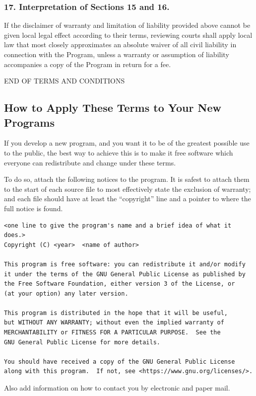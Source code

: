 \subsubsection{17. Interpretation of Sections 15 and 16.}
If the disclaimer of warranty and limitation of liability provided above cannot be given local legal effect according to their terms, reviewing courts shall apply local law that most closely approximates an absolute waiver of all civil liability in connection with the Program, unless a warranty or assumption of liability accompanies a copy of the Program in return for a fee.
\begin{center}END OF TERMS AND CONDITIONS\end{center}
\subsection{How to Apply These Terms to Your New Programs}
If you develop a new program, and you want it to be of the greatest possible use to the public, the best way to achieve this is to make it free software which everyone can redistribute and change under these terms.\par
To do so, attach the following notices to the program. It is safest to attach them to the start of each source file to most effectively state the exclusion of warranty; and each file should have at least the “copyright” line and a pointer to where the full notice is found.
\begin{verbatim}
<one line to give the program's name and a brief idea of what it does.>
Copyright (C) <year>  <name of author>

This program is free software: you can redistribute it and/or modify
it under the terms of the GNU General Public License as published by
the Free Software Foundation, either version 3 of the License, or
(at your option) any later version.

This program is distributed in the hope that it will be useful,
but WITHOUT ANY WARRANTY; without even the implied warranty of
MERCHANTABILITY or FITNESS FOR A PARTICULAR PURPOSE.  See the
GNU General Public License for more details.

You should have received a copy of the GNU General Public License
along with this program.  If not, see <https://www.gnu.org/licenses/>.
\end{verbatim}\par
Also add information on how to contact you by electronic and paper mail.\par
